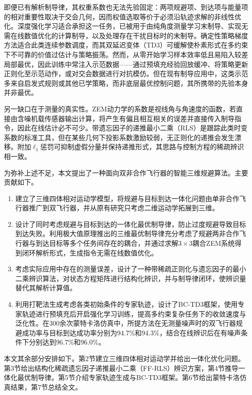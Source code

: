 即便已有解析制导律，其权重系数也无法先验固定：两项规避项、到达项与能量项的相对重要性取决于交会几何，因而权值选取等价于必须沿轨迹求解的非线性优化。深度强化学习适合承担这一任务，已被用于由纯角度测量学习末制导\cite{gaudet2020}、实现无需在线数值优化的计算制导\cite{he2021}，以及处理存在干扰目标时的末制导\cite{deng2023}。确定性策略梯度方法适合此类连续参数调度\cite{lillicrap2016}，而其双延迟变体（TD3）可缓解使朴素形式在多约束下不可靠的价值过估计与策略振荡\cite{fujimoto2018}。然而，从零开始学习样本效率低且易陷入较差局部最优，因此训练中常注入示范数据——通过预填充经验回放缓冲\cite{hester2018,vecerik2017}、将策略更新正则化至示范动作\cite{fujimoto2021}，或对交会数据进行对抗模仿\cite{hu2022,hui2025}。但在现有制导应用中，这类示范多来自启发式规则或其他已学策略，而非底层最优控制问题，其所携带的先验本身并非最优。

另一缺口在于测量的真实性。ZEM动力学的系数是视线角与角速度的函数，若直接由含噪机载传感器输出计算，将产生有偏且相互相关的误差并直接传入制导指令，因此在线估计必不可少\cite{liu2025}。带遗忘因子的递推最小二乘（RLS）是跟踪此类时变系数的标准工具\cite{paleologu2008,bruce2020}，但在某些几何下投影系数激励较弱，无正则化的递推会发生漂移。附加$\ell_1$惩罚可抑制虚假分量并保持递推形式\cite{angelosante2010}，其思路与控制方程的稀疏辨识相一致\cite{brunton2016}。

为弥补上述不足，本文提出了一种面向双非合作飞行器的智能三维规避算法。主要贡献如下。

\begin{enumerate}
\item 建立了三维四体相对运动学模型，将规避与目标到达一体化问题由单非合作飞行器推广到双飞行器，并从原有研究只考虑二维运动学拓展到三维。
\item 设计了同时考虑规避与目标到达的一体化最优制导律，防止过度规避导致目标到达失败。利用极大值原理推出的三维最优制导律充分考虑了规避两非合作飞行器与到达目标等多个任务间存在的耦合，并通过求解$3\times 3$耦合ZEM系统得到闭环解析形式，生成指令无需在线数值优化。
\item 考虑实际应用中存在的测量误差，设计了一种带稀疏正则化与遗忘因子的最小二乘辨识算法，对状态方程矩阵进行结构化辨识，并与制导律闭环，使辨识量替代其解析计算值。
\item 利用打靶法生成考虑各类初始条件的专家轨迹，设计了BC-TD3框架，使用专家轨迹进行预填充后开启强化学习训练，提高多约束复杂任务下的收敛速度与泛化性。在300余次蒙特卡洛仿真中，所提方法在无测量噪声时的双飞行器规避成功率与目标到达成功率分别为94.7\%和94.3\%，结合在线辨识后在有噪声条件下分别达到96.7\%和96.0\%。
\end{enumerate}

本文其余部分安排如下。第2节建立三维四体相对运动学并给出一体化优化问题。第3节给出结构化稀疏遗忘因子递推最小二乘（FF-RLS）辨识方案，第4节推导一体化最优制导律。第5节介绍专家轨迹生成与BC-TD3框架。第6节给出蒙特卡洛仿真结果，第7节总结全文。
